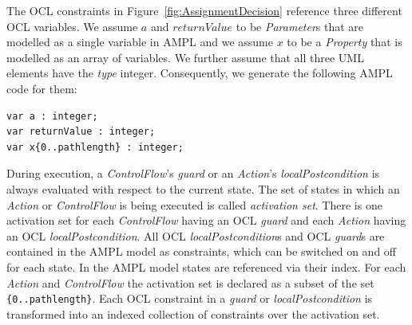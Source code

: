 \documentclass[runningheads,a4paper]{llncs}%
\newcommand{\UMLType}[1]{\textsf{\textit{#1}}} %
\newcommand{\UMLReference}[1]{\textsf{\textit{#1}}} %
\newcommand{\AMPLCode}[1]{\texttt{#1}}
\begin{document}
The OCL constraints in Figure~\ref{fig:AssignmentDecision} reference three
different OCL variables. We assume $a$ and $returnValue$ to be
\UMLType{Parameter}s that are modelled as a single variable in AMPL and we
assume $x$ to be a \UMLType{Property} that is modelled as an array of variables.
We further assume that all three UML elements have the \UMLReference{type}
integer. Consequently, we generate the following AMPL code for them: %
\begin{lstlisting}[basicstyle=\ttfamily,language=ampl]
var a : integer;
var returnValue : integer;
var x{0..pathlength} : integer;
\end{lstlisting}%

During execution, a \UMLType{ControlFlow}'s \UMLReference{guard} or an
\UMLType{Action}'s \UMLReference{localPostcondition} is always evaluated with
respect to the current state. The set of states in which an \UMLType{Action} or
\UMLType{ControlFlow} is being executed is called \emph{activation set}. There
is one activation set for each \UMLType{ControlFlow} having an OCL
\UMLReference{guard} and each \UMLType{Action} having an OCL
\UMLReference{localPostcondition}. All OCL \UMLReference{localPostcondition}s
and OCL \UMLReference{guard}s are contained in the AMPL model as constraints,
which can be switched on and off for each state. In the AMPL model states are
referenced via their index. For each \UMLType{Action} and \UMLType{ControlFlow}
the activation set is declared as a subset of the set
\AMPLCode{\{0..pathlength\}}. Each OCL constraint in a \UMLReference{guard} or
\UMLReference{localPostcondition} is transformed into an indexed collection of
constraints over the activation set.
\end{document}
